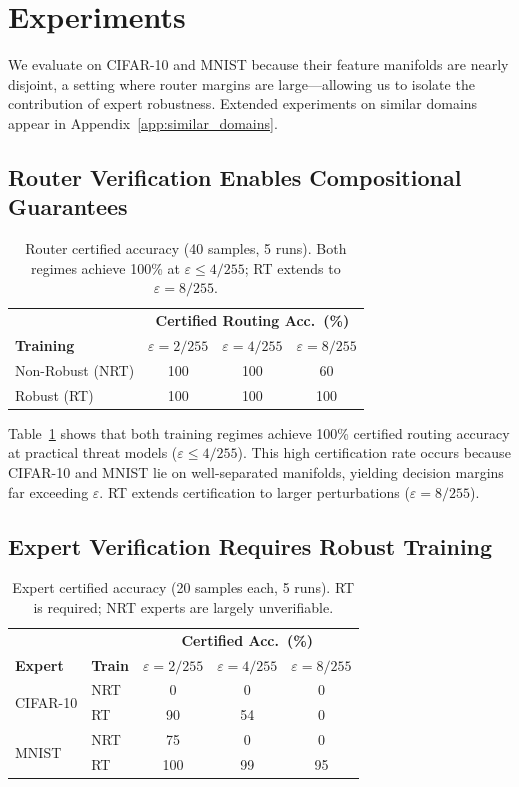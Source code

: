 \documentclass{article}
\theoremstyle{plain}
\theoremstyle{remark}
\begin{document}
\section{Experiments}

We evaluate on CIFAR-10 and MNIST because their feature manifolds are nearly disjoint, a setting where router margins are large---allowing us to isolate the contribution of expert robustness. Extended experiments on similar domains appear in Appendix~\ref{app:similar_domains}.

\subsection{Router Verification Enables Compositional Guarantees}

\begin{table}[!t]
\centering
\small
\begin{tabular}{@{}lccc@{}}
\toprule
& \multicolumn{3}{c}{\textbf{Certified Routing Acc.\ (\%)}} \\
\textbf{Training} & $\varepsilon{=}2/255$ & $\varepsilon{=}4/255$ & $\varepsilon{=}8/255$ \\
\midrule
Non-Robust (NRT) & 100 & 100 & 60 \\
Robust (RT) & 100 & 100 & 100 \\
\bottomrule
\end{tabular}
\caption{Router certified accuracy (40 samples, 5 runs). Both regimes achieve 100\% at $\varepsilon \leq 4/255$; RT extends to $\varepsilon = 8/255$.}
\label{tab:router}
\end{table}

Table~\ref{tab:router} shows that both training regimes achieve 100\% certified routing accuracy at practical threat models ($\varepsilon \leq 4/255$). This high certification rate occurs because CIFAR-10 and MNIST lie on well-separated manifolds, yielding decision margins far exceeding $\varepsilon$. RT extends certification to larger perturbations ($\varepsilon = 8/255$).

\subsection{Expert Verification Requires Robust Training}

\begin{table}[!t]
\centering
\small
\begin{tabular}{@{}llccc@{}}
\toprule
& & \multicolumn{3}{c}{\textbf{Certified Acc.\ (\%)}} \\
\textbf{Expert} & \textbf{Train} & $\varepsilon{=}2/255$ & $\varepsilon{=}4/255$ & $\varepsilon{=}8/255$ \\
\midrule
\multirow{2}{*}{CIFAR-10} & NRT & 0 & 0 & 0 \\
& RT & 90 & 54 & 0 \\
\midrule
\multirow{2}{*}{MNIST} & NRT & 75 & 0 & 0 \\
& RT & 100 & 99 & 95 \\
\bottomrule
\end{tabular}
\caption{Expert certified accuracy (20 samples each, 5 runs). RT is required; NRT experts are largely unverifiable.}
\label{tab:expert}
\end{table}
\end{document}
